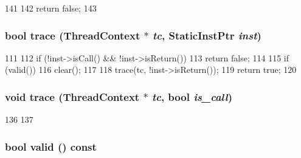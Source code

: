 \begin{DoxyCode}
141     {
142         return false;
143     }
\end{DoxyCode}
\hypertarget{classX86ISA_1_1StackTrace_aabb136846a5e22007e44db846652ddd5}{
\subsubsection[{trace}]{\setlength{\rightskip}{0pt plus 5cm}bool trace ({\bf ThreadContext} $\ast$ {\em tc}, \/  {\bf StaticInstPtr} {\em inst})}}
\label{classX86ISA_1_1StackTrace_aabb136846a5e22007e44db846652ddd5}



\begin{DoxyCode}
111     {
112         if (!inst->isCall() && !inst->isReturn())
113             return false;
114 
115         if (valid())
116             clear();
117 
118         trace(tc, !inst->isReturn());
119         return true;
120     }
\end{DoxyCode}
\hypertarget{classX86ISA_1_1StackTrace_a46d6b95a2e5fdb75702cf45e39566645}{
\subsubsection[{trace}]{\setlength{\rightskip}{0pt plus 5cm}void trace ({\bf ThreadContext} $\ast$ {\em tc}, \/  bool {\em is\_\-call})}}
\label{classX86ISA_1_1StackTrace_a46d6b95a2e5fdb75702cf45e39566645}



\begin{DoxyCode}
136     {
137     }
\end{DoxyCode}
\hypertarget{classX86ISA_1_1StackTrace_a8d985300b138b6c5556ab17ed4df3b38}{
\subsubsection[{valid}]{\setlength{\rightskip}{0pt plus 5cm}bool valid () const}}
\label{classX86ISA_1_1StackTrace_a8d985300b138b6c5556ab17ed4df3b38}



